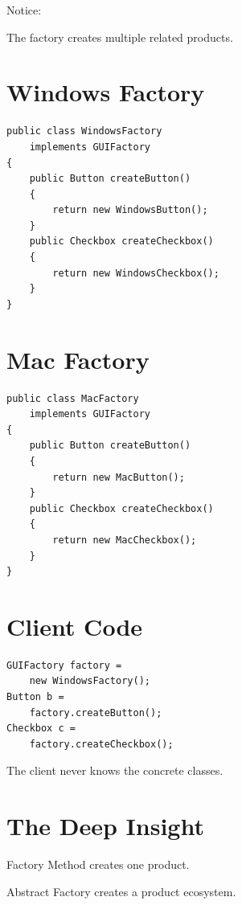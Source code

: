 \documentclass[11pt,a4paper]{book}
\begin{document}
Notice:

The factory creates multiple related products.


\section{Windows Factory}

\begin{verbatim}
public class WindowsFactory
    implements GUIFactory
{
    public Button createButton()
    {
        return new WindowsButton();
    }
    public Checkbox createCheckbox()
    {
        return new WindowsCheckbox();
    }
}
\end{verbatim}


\section{Mac Factory}

\begin{verbatim}
public class MacFactory
    implements GUIFactory
{
    public Button createButton()
    {
        return new MacButton();
    }
    public Checkbox createCheckbox()
    {
        return new MacCheckbox();
    }
}
\end{verbatim}


\section{Client Code}

\begin{verbatim}
GUIFactory factory =
    new WindowsFactory();
Button b =
    factory.createButton();
Checkbox c =
    factory.createCheckbox();
\end{verbatim}

The client never knows the concrete classes.


\section{The Deep Insight}

\begin{idea}

Factory Method creates one product.

Abstract Factory creates a product ecosystem.

\end{idea}
\end{document}
